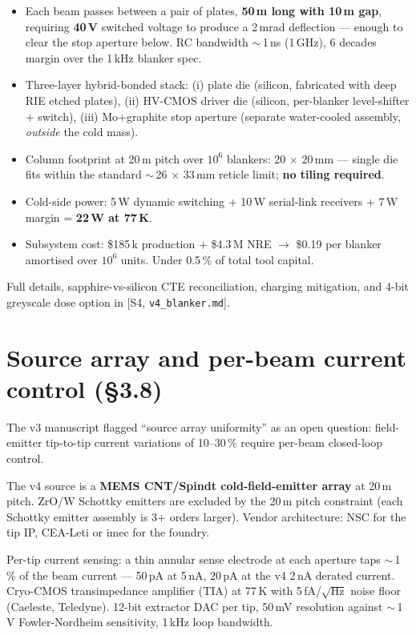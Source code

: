 \documentclass[11pt,letterpaper]{article}
\begin{document}
\begin{itemize}[leftmargin=1.6em]
  \item Each beam passes between a pair of plates, \textbf{50\,\textmu m long with 10\,\textmu m gap}, requiring \textbf{40\,V} switched voltage to produce a 2\,mrad deflection --- enough to clear the stop aperture below. RC bandwidth $\sim$\,1\,ns (1\,GHz), 6 decades margin over the 1\,kHz blanker spec.
  \item Three-layer hybrid-bonded stack: (i) plate die (silicon, fabricated with deep RIE etched plates), (ii) HV-CMOS driver die (silicon, per-blanker level-shifter + switch), (iii) Mo+graphite stop aperture (separate water-cooled assembly, \textit{outside} the cold mass).
  \item Column footprint at 20\,\textmu m pitch over $10^6$ blankers: 20 $\times$ 20\,mm --- single die fits within the standard $\sim$\,26 $\times$ 33\,mm reticle limit; \textbf{no tiling required}.
  \item Cold-side power: 5\,W dynamic switching + 10\,W serial-link receivers + 7\,W margin = \textbf{22\,W at 77\,K}.
  \item Subsystem cost: \$185\,k production + \$4.3\,M NRE $\to$ \$0.19 per blanker amortised over $10^6$ units. Under 0.5\,\% of total tool capital.
\end{itemize}

Full details, sapphire-vs-silicon CTE reconciliation, charging mitigation, and 4-bit greyscale dose option in [S4, \texttt{v4\_blanker.md}].

\section{Source array and per-beam current control (\S 3.8)}

The v3 manuscript flagged ``source array uniformity'' as an open question: field-emitter tip-to-tip current variations of 10--30\,\% require per-beam closed-loop control.

The v4 source is a \textbf{MEMS CNT/Spindt cold-field-emitter array} at 20\,\textmu m pitch. ZrO/W Schottky emitters are excluded by the 20\,\textmu m pitch constraint (each Schottky emitter assembly is 3+ orders larger). Vendor architecture: NSC for the tip IP, CEA-Leti or imec for the foundry.

Per-tip current sensing: a thin annular sense electrode at each aperture taps $\sim$\,1\,\% of the beam current --- 50\,pA at 5\,nA, 20\,pA at the v4 2\,nA derated current. Cryo-CMOS transimpedance amplifier (TIA) at 77\,K with 5\,fA/$\sqrt{\text{Hz}}$ noise floor (Caeleste, Teledyne). 12-bit extractor DAC per tip, 50\,mV resolution against $\sim$\,1\,V Fowler-Nordheim sensitivity, 1\,kHz loop bandwidth.
\end{document}
